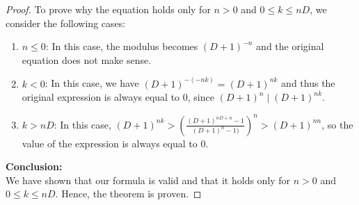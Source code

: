 \documentclass{article}
\theoremstyle{plain}
\begin{document}
\begin{proof}
To prove why the equation holds only for $n > 0$ and $0 \leq k \leq nD$, we consider the following cases:
\begin{enumerate}
\item $n \leq 0$: In this case, the modulus becomes $(D+1)^{-n}$ and the original equation does not make sense.
\item $k < 0$: In this case, we have $(D+1)^{-(-nk)} = (D+1)^{nk}$ and thus the original expression is always equal to $0$, since $(D+1)^{n} \mid (D+1)^{nk}$.
\item $k > nD$: In this case, $(D+1)^{nk} > \left(\frac{(D + 1)^{n D + n} - 1}{(D + 1)^{n} - 1)}\right)^{n} > (D+1)^{nn}$, so the value of the expression is always equal to $0$.
\end{enumerate}
\noindent
\textbf{Conclusion:}
\\
We have shown that our formula is valid and that it holds only for $n > 0$ and $0 \leq k \leq nD$. Hence, the theorem is proven.
\end{proof}
\end{document}
